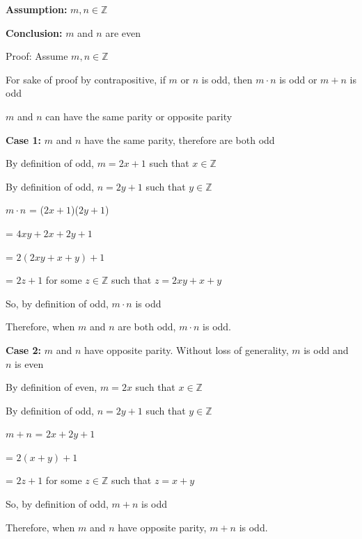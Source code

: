 \documentclass{article} %
\begin{document}


    \textbf{Assumption:} $m, n \in \mathbb{Z}$
    
    \textbf{Conclusion:} $m$ and $n$ are even

    Proof: Assume $m, n \in \mathbb{Z}$

    For sake of proof by contrapositive, if $m$ or $n$ is odd, then $m \cdot n$ is odd or $m+n$ is odd

    $m$ and $n$ can have the same parity or opposite parity

    \vspace*{0.1cm}

    \textbf{Case 1:} $m$ and $n$ have the same parity, therefore are both odd

    By definition of odd, $m = 2x + 1$ such that $x \in \mathbb{Z}$ 
    
    By definition of odd, $n = 2y + 1$ such that $y \in \mathbb{Z}$

    $m \cdot n$ = ($2x + 1$)($2y + 1$)

    \tabto*{1.42cm} = $4xy + 2x + 2y + 1$

    \tabto*{1.42cm} = $2(2xy + x + y) + 1$

    \tabto*{1.42cm} = $2z + 1$ for some $z \in \mathbb{Z}$ such that $z = 2xy + x + y$

    So, by definition of odd, $m \cdot n$ is odd

    Therefore, when $m$ and $n$ are both odd, $m \cdot n$ is odd.

    \vspace*{0.1cm}

    \textbf{Case 2:} $m$ and $n$ have opposite parity. Without loss of generality, $m$ is odd and $n$ is even

    By definition of even, $m = 2x$ such that $x \in \mathbb{Z}$ 
    
    By definition of odd, $n = 2y + 1$ such that $y \in \mathbb{Z}$

    $m + n$ = $2x + 2y + 1$

    \tabto*{1.6cm} = $2(x + y) + 1$

    \tabto*{1.6cm} = $2z + 1$ for some $z \in \mathbb{Z}$ such that $z = x + y$

    So, by definition of odd, $m + n$ is odd
    
    Therefore, when $m$ and $n$ have opposite parity, $m+n$ is odd.
\end{document}
